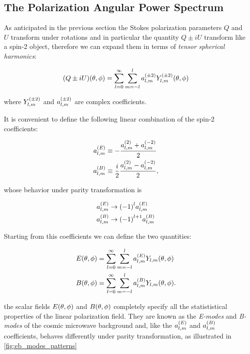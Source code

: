 \subsection{The Polarization Angular Power Spectrum}

As anticipated in the previous section the Stokes polarization parameters
$Q$ and $U$ transform under rotations and in particular the quantity $Q \pm
iU$ transform like a spin-2 object, therefore we can expand them in terms
of \emph{tensor spherical harmonics}:

\begin{equation}
        (Q \pm iU)\qty(\theta,\phi) = \sum^\infty_{l=0}\sum^l_{m=-l}
        a^{\qty(\pm 2)}_{l,m} Y^{\qty(\pm 2)}_{l,m}\qty(\theta,\phi)
\end{equation}

where $Y^{\qty(\pm 2)}_{l,m}$ and $a^{\qty(\pm 2)}_{l,m}$ are complex
coefficients.

It is convenient to define the following linear combination of the spin-2
coefficients:

\begin{align}
        a^{\qty(E)}_{l,m} & \equiv -\frac{a^{\qty(2)}_{l,m} + a^{\qty(-2)}_{l,m}}
        {2} \\
        a^{\qty(B)}_{l,m} & \equiv \frac{i}{2}
        \frac{a^{\qty(2)}_{l,m} - a^{\qty(-2)}_{l,m}}{2},
\end{align}

whose behavior under parity transformation is

\begin{align}
        a^{\qty(E)}_{l,m} & \rightarrow \qty(-1)^l a^{\qty(E)}_{l,m} \\
        a^{\qty(B)}_{l,m} & \rightarrow \qty(-1)^{l + 1} a^{\qty(B)}_{l,m}
\end{align}

Starting from this coefficients we can define the two quantities:

\begin{align}
        E\qty(\theta,\phi) & = \sum^\infty_{l=0}\sum^l_{m=-l}
        a^{\qty(E)}_{l,m} Y_{l,m}\qty(\theta,\phi) \\
        B\qty(\theta,\phi) & = \sum^\infty_{l=0}\sum^l_{m=-l}
        a^{\qty(B)}_{l,m} Y_{l,m}\qty(\theta,\phi).
\end{align}

the scalar fields $E\qty(\theta,\phi)$ and $B\qty(\theta,\phi)$ completely
specify all the statististical properties of the linear polarization
field. They are known as the \emph{E-modes} and \emph{B-modes} of the
cosmic microwave background and, like the $a^{\qty(E)}_{l,m}$ and
$a^{\qty(B)}_{l,m}$ coefficients, behaves differently under parity
transformation, as illustrated in \autoref{fig:eb_modes_patterns}

